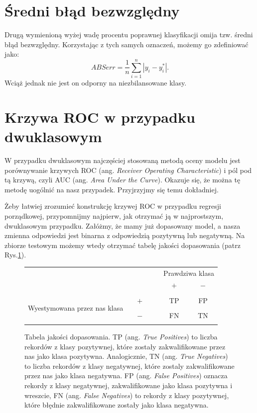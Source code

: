 \documentclass{mini}
\begin{document}
\section{Średni błąd bezwzględny}

Drugą wymienioną wyżej wadę procentu poprawnej klasyfikacji omija tzw. średni błąd bezwzględny. Korzystając z tych samych oznaczeń, możemy go zdefiniować jako:
$$
ABSerr = \frac{1}{n}\sum_{i=1}^n | y_i - y^\ast_i |. 
$$
Wciąż jednak nie jest on odporny na niezbilansowane klasy. 

\section{Krzywa ROC w przypadku dwuklasowym}

W przypadku dwuklasowym najczęściej stosowaną metodą oceny modelu jest porównywanie krzywych ROC (ang. \textit{Receiver Operating Characteristic}) i pól pod tą krzywą, czyli AUC (ang. \textit{Area Under the Curve}). Okazuje się, że można tę metodę uogólnić na nasz przypadek. Przyjrzyjmy się temu dokładniej. 

Żeby łatwiej zrozumieć konstrukcję krzywej ROC w przypadku regresji porządkowej, przypomnijmy najpierw, jak otrzymać ją w najprostszym, dwuklasowym przypadku. Załóżmy, że mamy już dopasowany model, a nasza zmienna odpowiedzi jest binarna z odpowiedzią pozytywną lub negatywną. Na zbiorze testowym możemy wtedy otrzymać tabelę jakości dopasowania (patrz Rys.\ref{tabeladopasowania}).

\begin{figure}[h]
		\begin{center}
		\begin{tabular}{c c c c | | c c c} 
			& & & & & \multicolumn{2}{c}{ Prawdziwa klasa}\\ 
			& & & & & $+$ & $-$ \\
			\hline
			\hline
			& & & & & & \\
			\multirow{3}{*}{\parbox{4cm}{\centering  Wyestymowana przez nas klasa}}
			& & $+$ & & & TP & FP\\
			& & & & &\\
			& & $-$ & & & FN & TN\\
			& & & & & &
		\end{tabular}
		\end{center}
	\caption{Tabela jakości dopasowania. TP (ang. \textit{True Positives}) to liczba rekordów z klasy pozytywnej, które zostały zakwalifikowane przez nas jako klasa pozytywna. Analogicznie, TN (ang. \textit{True Negatives}) to liczba rekordów z klasy negatywnej, które zostaly zakwalifikowane przez nas jako klasa negatywna. FP (ang. \textit{False Positives}) oznacza rekordy z klasy negatywnej, zakwalifikowane jako klasa pozytywna i wreszcie, FN (ang. \textit{False Negatives}) to rekordy z klasy pozytywnej, które błędnie zakwalifikowane zostały jako klasa negatywna.}
\label{tabeladopasowania}	
\end{figure}
\newpage
\vfill
\end{document}
